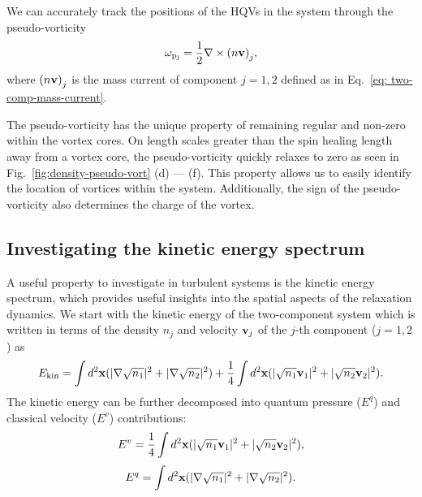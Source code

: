 We can accurately track the positions of the HQVs in the system through
the pseudo-vorticity~\cite{Villois2016}
\begin{equation}
    \omega_\mathrm{p_j} = \frac{1}{2}\nabla \times {(n\vb{v})}_j,
\end{equation}
where \({(n\vb{v})}_j\) is the mass current of component \(j=1, 2\) defined as
in Eq.~\eqref{eq: two-comp-mass-current}.

The pseudo-vorticity has the unique property of remaining regular and non-zero
within the vortex cores. On length scales greater than the spin healing length
away from a vortex core, the pseudo-vorticity quickly relaxes to zero as seen
in Fig.~\ref{fig:density-pseudo-vort} (d) --- (f).
This property allows us to easily identify the location of vortices within the
system.
Additionally, the sign of the pseudo-vorticity also determines the charge of
the vortex.

\subsection{Investigating the kinetic energy spectrum}
A useful property to investigate in turbulent systems is the kinetic energy
spectrum, which provides useful insights into the spatial aspects of the
relaxation dynamics.
We start with the kinetic energy of the two-component system which is written
in terms of the density \(n_j\) and velocity \(\vb{v}_j\) of the \(j\)-th
component (\( j=1,2 \)) as
\begin{equation}
    E_\mathrm{kin} = \int d^2\vb{x} (|\nabla\sqrt{n_1}|^2 
    + |\nabla\sqrt{n_2}|^2)
    + \frac{1}{4}\int d^2\vb{x} (|\sqrt{n_1}\vb{v}_1|^2 
    + |\sqrt{n_2}\vb{v}_2|^2).
\end{equation}
The kinetic energy can be further decomposed into quantum pressure
(\( E^q\)) and classical velocity (\(E^v\)) contributions:
\begin{equation}
    E^v = \frac{1}{4}\int d^2\vb{x} (|\sqrt{n_1}\vb{v}_1|^2 
    + |\sqrt{n_2}\vb{v}_2|^2),
\end{equation}
\begin{equation}
    E^q = \int d^2\vb{x} (|\nabla\sqrt{n_1}|^2 
    + |\nabla\sqrt{n_2}|^2).
\end{equation}

